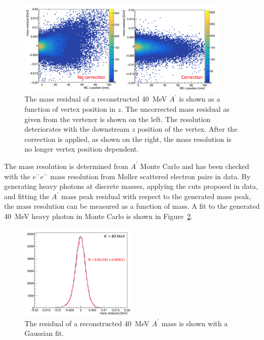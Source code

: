 \begin{figure}[htb]
  \centering
      \includegraphics[width=0.9\textwidth]{pics/searching/massCorrection.png}
  \caption[Correction to the reconstructed mass for a 40~MeV $A^{\prime}$]{The mass residual of a reconstructed 40~MeV $A^{\prime}$ is shown as a function of vertex position in $z$. The uncorrected mass residual as given from the vertexer is shown on the left. The resolution deteriorates with the downstream $z$ position of the vertex. After the correction is applied, as shown on the right, the mass resolution is no longer vertex position dependent.}
  \label{fig:effectMCorr}
\end{figure} 

The mass resolution is determined from $A^{\prime}$ Monte Carlo and has been checked with the $e^-e^-$ mass resolution from M\o ller scattered electron pairs in data. By generating heavy photons at discrete masses, applying the cuts proposed in data, and fitting the $A^{\prime}$ mass peak residual with respect to the generated mass peak, the mass resolution can be measured as a function of mass. A fit to the generated 40~MeV heavy photon in Monte Carlo is shown in Figure~\ref{fig:ap40mev}.

\begin{figure}[htb]
  \centering
      \includegraphics[width=0.5\textwidth]{pics/searching/ap40mev.png}
  \caption[Fit to the mass residual of a 40~MeV $A^{\prime}$]{The residual of a reconstructed 40~MeV $A^{\prime}$ mass is shown with a Gaussian fit.}
  \label{fig:ap40mev}
\end{figure} 


